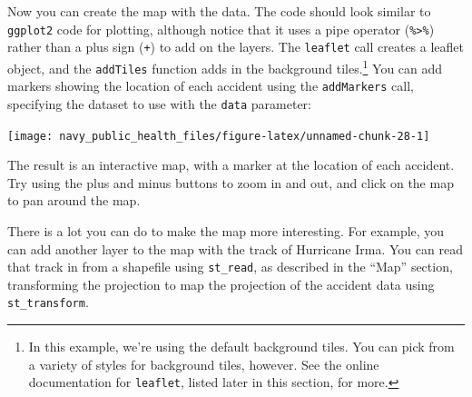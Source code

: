 \documentclass[]{tufte-book}
\newenvironment{Shaded}{}{}
\newcommand{\DataTypeTok}[1]{\textcolor[rgb]{0.56,0.13,0.00}{#1}}
\newcommand{\DecValTok}[1]{\textcolor[rgb]{0.25,0.63,0.44}{#1}}
\newcommand{\KeywordTok}[1]{\textcolor[rgb]{0.00,0.44,0.13}{\textbf{#1}}}
\newcommand{\NormalTok}[1]{#1}
\newcommand{\OperatorTok}[1]{\textcolor[rgb]{0.40,0.40,0.40}{#1}}
\newcommand{\StringTok}[1]{\textcolor[rgb]{0.25,0.44,0.63}{#1}}
\begin{document}
\begin{Shaded}
\end{Shaded}

Now you can create the map with the data. The code should look similar to \texttt{ggplot2} code for
plotting, although notice that it uses a pipe operator (\texttt{\%\textgreater{}\%}) rather than a plus sign (\texttt{+}) to
add on the layers. The \texttt{leaflet} call creates a leaflet object, and the \texttt{addTiles} function adds in
the background tiles.\footnote{In this example, we're using the default background tiles. You can pick from
  a variety of styles for background tiles, however. See the online documentation for \texttt{leaflet},
  listed later in this section, for more.} You can add markers showing the location of each accident
using the \texttt{addMarkers} call, specifying the dataset to use with the \texttt{data} parameter:

\begin{Shaded}
\end{Shaded}

\texttt{[image: navy\_public\_health\_files/figure-latex/unnamed-chunk-28-1]}

The result is an interactive map, with a marker at the location of each accident. Try using the
plus and minus buttons to zoom in and out, and click on the map to pan around the map.

There is a lot you can do to make the map more interesting. For example, you can add another layer
to the map with the track of Hurricane Irma. You can read that track in from a shapefile using
\texttt{st\_read}, as described in the ``Map'' section, transforming the projection to map the projection
of the accident data using \texttt{st\_transform}.
\end{document}
